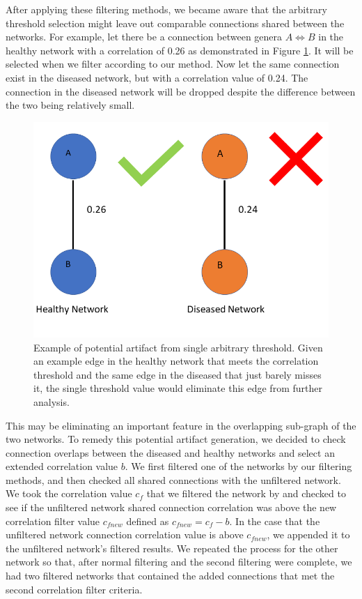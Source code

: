 After applying these filtering methods, we became aware that the arbitrary threshold selection might leave out comparable connections shared between the networks. For example, let there be a connection between genera $A \Leftrightarrow B$ in the healthy network with a correlation of 0.26 as demonstrated in Figure \ref{fig-artifact-edge}. It will be selected when we filter according to our method. Now let the same connection exist in the diseased network, but with a correlation value of 0.24. The connection in the diseased network will be dropped despite the difference between the two being relatively small. 
\begin{figure}[!hbt]
    \centering
    \includegraphics[width=0.7\linewidth]{figure/other/extended_filter.png}
    \caption[Example of potential artifact from single arbitrary threshold.]{Example of potential artifact from single arbitrary threshold. Given an example edge in the healthy network that meets the correlation threshold and the same edge in the diseased that just barely misses it, the single threshold value would eliminate this edge from further analysis.}
    \label{fig-artifact-edge}
\end{figure}
This may be eliminating an important feature in the overlapping sub-graph of the two networks. To remedy this potential artifact generation, we decided to check connection overlaps between the diseased and healthy networks and select an extended correlation value $b$. We first filtered one of the networks by our filtering methods, and then checked all shared connections with the unfiltered network. We took the correlation value $c_f$ that we filtered the network by and checked to see if the unfiltered network shared connection correlation was above the new correlation filter value $c_{f new}$ defined as $c_{f new} = c_f - b$. In the case that the unfiltered network connection correlation value is above $c_{f new}$, we appended it to the unfiltered network's filtered results. We repeated the process for the other network so that, after normal filtering and the second filtering were complete, we had two filtered networks that contained the added connections that met the second correlation filter criteria. 

